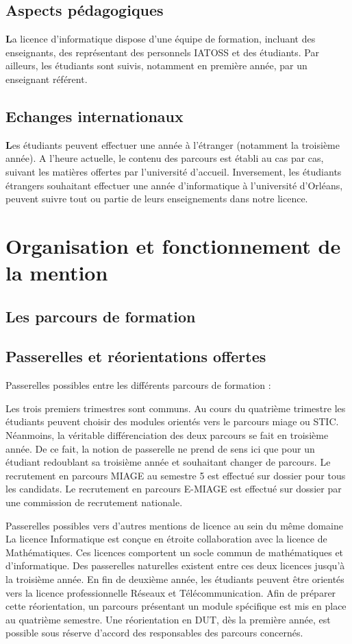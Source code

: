 \documentclass[10pt, a5paper]{report}
\begin{document}
\begin{spacing}{1.5}
{\section*{Aspects pédagogiques}
\textcolor{couleurFonce}{\textbf{\Large{L}}}a licence d’informatique dispose d’une équipe de formation, incluant des enseignants, des représentant des personnels IATOSS et des étudiants. Par ailleurs, les étudiants sont suivis, notamment en première année, par un enseignant référent.

\section*{Echanges internationaux}
\textcolor{couleurFonce}{\textbf{\Large{L}}}es étudiants peuvent effectuer une année à l’étranger (notamment la troisième année). A l’heure actuelle, le contenu des parcours est établi au cas par cas, suivant les matières offertes par l’université d’accueil. Inversement, les étudiants étrangers souhaitant effectuer une année d’informatique à l’université d’Orléans, peuvent suivre tout ou partie de leurs enseignements dans notre licence. 
}

\chapter*{Organisation et fonctionnement de la mention}
\section*{Les parcours de formation}
\section*{Passerelles et réorientations offertes}
Passerelles possibles entre les différents parcours de formation :

Les trois premiers trimestres sont communs. Au cours du quatrième trimestre les étudiants peuvent choisir des modules orientés vers le parcours miage ou STIC. Néanmoins, la véritable différenciation des deux parcours se fait en troisième année. De ce fait, la notion de passerelle ne prend de sens ici que pour un étudiant redoublant sa troisième année et souhaitant changer de parcours.
Le recrutement en parcours MIAGE au semestre 5 est effectué sur dossier pour tous les candidats. 
Le recrutement en parcours E-MIAGE est effectué sur dossier par une commission de recrutement nationale. 

Passerelles possibles vers d’autres mentions de licence au sein du même domaine
La licence Informatique est  conçue en étroite collaboration avec la licence de Mathématiques. Ces licences comportent un socle commun de mathématiques et d’informatique. Des passerelles naturelles existent entre ces deux licences jusqu'à la troisième année.
En fin de deuxième année, les étudiants peuvent être orientés vers la licence professionnelle Réseaux et Télécommunication. Afin de préparer cette réorientation, un parcours présentant un module spécifique est mis en place au quatrième semestre.
Une réorientation en DUT, dès la première année, est possible sous réserve d'accord des responsables des parcours concernés.


\end{spacing}
\end{document}

